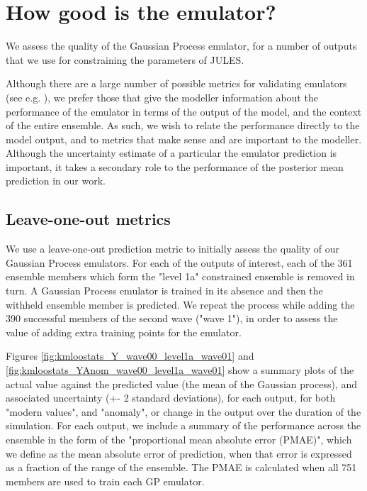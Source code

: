 \documentclass[gmd, manuscript]{copernicus}
\begin{document}
\section{How good is the emulator?}\label{app:emulator_accuracy}    %

We assess the quality of the Gaussian Process emulator, for a number of outputs that we use for constraining the parameters of JULES.

Although there are a large number of possible metrics for validating emulators (see e.g. \cite{al2018diagnostics}), we prefer those that give the modeller information about the performance of the emulator in terms of the output of the model, and the context of the entire ensemble. As such, we wish to relate the performance directly to the model output, and to metrics that make sense and are important to the modeller. Although the uncertainty estimate of a particular the emulator prediction is important, it takes a secondary role to the performance of the posterior mean prediction in our work.

\subsection{Leave-one-out metrics}\label{app:leave_one_out}     %

We use a leave-one-out prediction metric to initially assess the quality of our Gaussian Process emulators. For each of the outputs of interest, each of the 361 ensemble members which form the "level 1a" constrained ensemble is removed in turn. A Gaussian Process emulator is trained in its absence and then the withheld ensemble member is predicted. We repeat the process while adding the 390 successful members of the second wave ("wave 1"), in order to assess the value of adding extra training points for the emulator.

Figures \ref{fig:kmloostats_Y_wave00_level1a_wave01} and \ref{fig:kmloostats_YAnom_wave00_level1a_wave01}  show a summary plots of the actual value against the predicted value (the mean of the Gaussian process), and associated uncertainty (+- 2 standard deviations), for each output, for both "modern values", and "anomaly", or change in the output over the duration of the simulation. For each output, we include a summary of the performance across the ensemble in the form of the "proportional mean absolute error (PMAE)", which we define as the mean absolute error of prediction, when that error is expressed as a fraction of the range of the ensemble. The PMAE is calculated when all 751 members are used to train each GP emulator.
\end{document}

